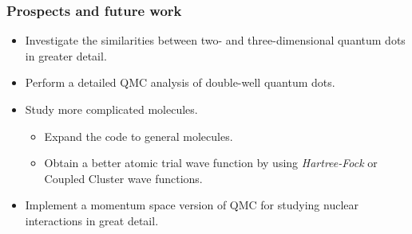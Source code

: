 \documentclass{beamer}
\begin{document}
\begin{frame}
 \frametitle{Prospects and future work}
 \begin{itemize}
  \item Investigate the similarities between two- and three-dimensional quantum dots in greater detail.
  \item Perform a detailed QMC analysis of double-well quantum dots.
  \item Study more complicated molecules.
  \begin{itemize}
  \item Expand the code to general molecules.
  \item Obtain a better atomic trial wave function by using \textit{Hartree-Fock} or Coupled Cluster wave functions.
  \end{itemize}
  \item Implement a momentum space version of QMC for studying nuclear interactions in great detail.
 \end{itemize}

\end{frame}
\end{document}
